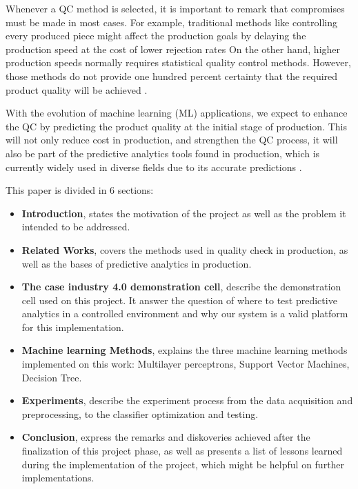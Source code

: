 \documentclass[5p,times,procedia]{elsarticle}
\begin{document}
Whenever a QC method is selected, it is important to remark that compromises must be made in most cases. For example, traditional methods like controlling every produced piece might affect the production goals by delaying the production speed at the cost of lower rejection rates On the other hand, higher production speeds normally requires statistical quality control methods. However, those methods do not provide one hundred percent certainty that the required product quality will be achieved \cite{selvamuthu2018introduction, kurniati2015quality}.

With the evolution of machine learning (ML) applications, we expect to enhance the QC by predicting the product quality at the initial stage of production. This will not only reduce cost in production, and strengthen the QC process, it will also be part of the predictive analytics tools found in production, which is currently widely used in diverse fields due to its accurate predictions \cite{bishop2006pattern, krauss2019machine}.

This paper is divided in 6 sections:

\begin{itemize}
       \item \textbf{Introduction}, states the motivation of the project as well as the problem it intended to be addressed.
       \item \textbf{Related Works}, covers the methods used in quality check in production, as well as the bases of predictive analytics in production.
       \item \textbf{The case industry 4.0 demonstration cell}, describe the demonstration cell used on this project. It answer the question of where to test predictive analytics in a controlled environment and why our system is a valid platform for this implementation.
       \item \textbf{Machine learning Methods}, explains the three machine learning methods implemented on this work: Multilayer perceptrons, Support Vector Machines, Decision Tree.
       \item \textbf{Experiments}, describe the experiment process from the data acquisition and preprocessing, to the classifier optimization and testing.
       \item \textbf{Conclusion}, express the remarks and diskoveries achieved after the finalization of this project phase, as well as presents a list of lessons learned during the implementation of the project, which might be helpful on further implementations.
\end{itemize}
\end{document}
